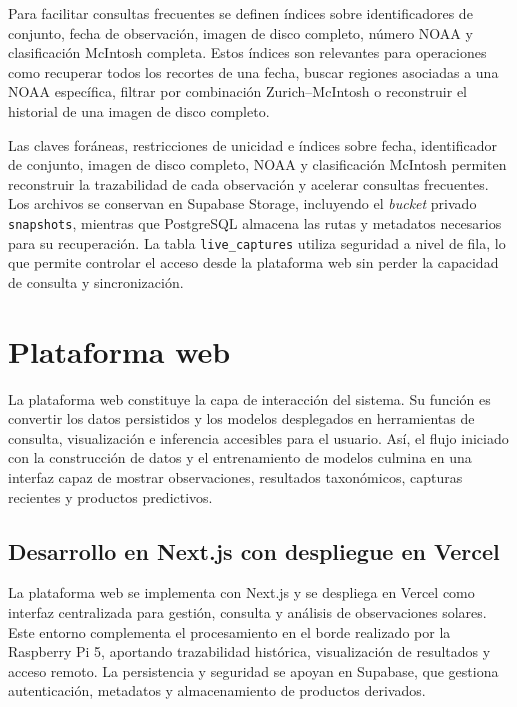 Para facilitar consultas frecuentes se definen índices sobre identificadores de
conjunto, fecha de observación, imagen de disco completo, número NOAA y
clasificación McIntosh completa. Estos índices son relevantes para operaciones
como recuperar todos los recortes de una fecha, buscar regiones asociadas a una
NOAA específica, filtrar por combinación Zurich--McIntosh o reconstruir el
historial de una imagen de disco completo.

Las claves foráneas, restricciones de unicidad e índices sobre fecha,
identificador de conjunto, imagen de disco completo, NOAA y clasificación
McIntosh permiten reconstruir la trazabilidad de cada observación y acelerar
consultas frecuentes. Los archivos se conservan en Supabase Storage, incluyendo
el \textit{bucket} privado \texttt{snapshots}, mientras que PostgreSQL almacena
las rutas y metadatos necesarios para su recuperación. La tabla
\texttt{live\_captures} utiliza seguridad a nivel de fila, lo que permite
controlar el acceso desde la plataforma web sin perder la capacidad de consulta y
sincronización.

\section{Plataforma web}

La plataforma web constituye la capa de interacción del sistema. Su función es
convertir los datos persistidos y los modelos desplegados en herramientas de
consulta, visualización e inferencia accesibles para el usuario. Así, el flujo
iniciado con la construcción de datos y el entrenamiento de modelos culmina en
una interfaz capaz de mostrar observaciones, resultados taxonómicos, capturas
recientes y productos predictivos.

\subsection{Desarrollo en Next.js con despliegue en Vercel}

La plataforma web se implementa con Next.js y se despliega en
Vercel como interfaz centralizada para gestión, consulta y análisis de
observaciones solares. Este entorno complementa el procesamiento en el borde
realizado por la Raspberry Pi 5, aportando trazabilidad histórica, visualización
de resultados y acceso remoto. La persistencia y seguridad se apoyan en
Supabase, que gestiona autenticación, metadatos y almacenamiento de
productos derivados.

